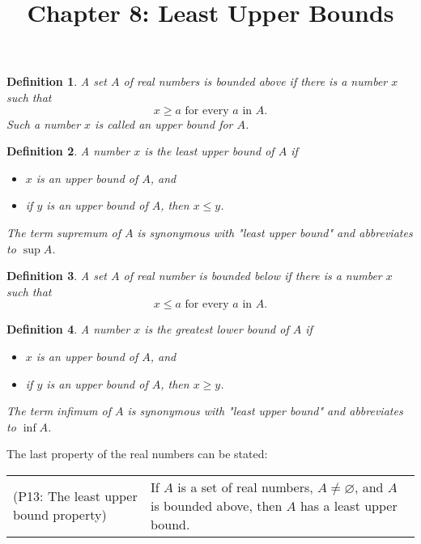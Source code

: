 \documentclass{article}
\newtheorem{definition}{Definition}
\begin{document}
\title{Chapter 8: Least Upper Bounds}
\maketitle

\begin{definition}
  A set $A$ of real numbers is \emph{bounded above} if there is a number $x$
  such that \[
    x \geq a \text{ for every } a \text{ in } A.
  \] Such a number $x$ is called an \emph{upper bound} for $A$.
\end{definition}

\begin{definition}
  A number $x$ is the \emph{least upper bound} of $A$ if
  \begin{itemize}
    \item $x$ is an upper bound of $A$, and
    \item if $y$ is an upper bound of $A$, then $x \leq y$.
  \end{itemize}

  The term \emph{supremum} of $A$ is synonymous with "least upper bound" and
  abbreviates to $\sup A$.
\end{definition}

\begin{definition}
  A set $A$ of real number is \emph{bounded below} if there is a number $x$
  such that
  \[
    x \leq a \text{ for every } a \text{ in } A.
  \]
\end{definition}

\begin{definition}
  A number $x$ is the \emph{greatest lower bound} of $A$ if
  \begin{itemize}
    \item $x$ is an upper bound of $A$, and
    \item if $y$ is an upper bound of $A$, then $x \geq y$.
  \end{itemize}

  The term \emph{infimum} of $A$ is synonymous with "least upper bound" and
  abbreviates to $\inf A$.
\end{definition}

The last property of the real numbers can be stated:

\begin{tabular}{l p{1.8in}}
  (P13: The least upper bound property) & If $A$ is a set of real numbers, $A
  \neq \varnothing$, and $A$ is bounded above, then $A$ has a least upper
  bound.
\end{tabular}
\end{document}
